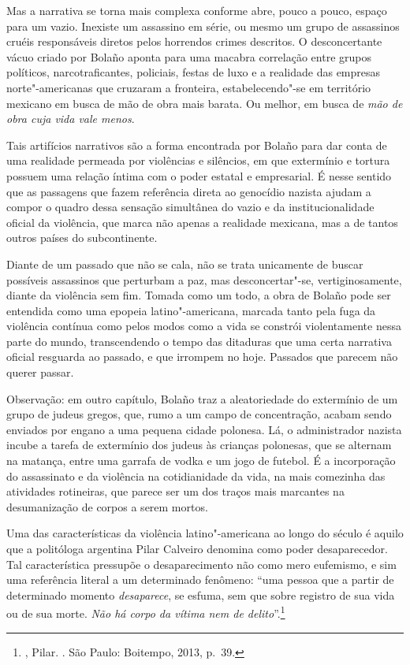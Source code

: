 Mas a narrativa se torna mais complexa conforme abre, pouco a pouco,
espaço para um vazio. Inexiste um assassino em série, ou mesmo um grupo
de assassinos cruéis responsáveis diretos pelos horrendos crimes
descritos. O desconcertante vácuo criado por Bolaño aponta para uma
macabra correlação entre grupos políticos, narcotraficantes, policiais,
festas de luxo e a realidade das empresas norte"-americanas que cruzaram
a fronteira, estabelecendo"-se em território mexicano em busca de mão de obra
mais barata. Ou melhor, em busca de \emph{mão de obra cuja vida vale
menos}.

Tais artifícios narrativos são a forma encontrada por Bolaño para dar
conta de uma realidade permeada por violências e silêncios, em que
extermínio e tortura possuem uma relação íntima com o poder estatal e
empresarial. É nesse sentido que as passagens que fazem referência
direta ao genocídio nazista ajudam a compor o quadro dessa sensação
simultânea do vazio e da institucionalidade oficial da violência, que
marca não apenas a realidade mexicana, mas a de tantos outros países do
subcontinente.

Diante de um passado que não se cala, não se trata unicamente de buscar possíveis
assassinos que perturbam a paz, mas desconcertar"-se, vertiginosamente,
diante da violência sem fim. Tomada como um todo, a obra de Bolaño pode
ser entendida como uma epopeia latino"-americana, marcada tanto pela
fuga da violência contínua como pelos modos como a vida se constrói
violentamente nessa parte do mundo, transcendendo o tempo das ditaduras
que uma certa narrativa oficial resguarda ao passado, e que irrompem no
hoje. Passados que parecem não querer passar.

Observação: em outro capítulo, Bolaño traz a aleatoriedade do extermínio
de um grupo de judeus gregos, que, rumo a um campo de concentração,
acabam sendo enviados por engano a uma pequena cidade polonesa. Lá, o
administrador nazista incube a tarefa de extermínio dos judeus às
crianças polonesas, que se alternam na matança, entre uma garrafa de vodka
e um jogo de futebol. É a incorporação do assassinato e da violência na
cotidianidade da vida, na mais comezinha das atividades rotineiras, que
parece ser um dos traços mais marcantes na desumanização de corpos a
serem mortos.

\asterisc

Uma das características da violência latino"-americana ao longo do século
 é aquilo que a politóloga argentina Pilar Calveiro denomina como
poder desaparecedor. Tal característica pressupõe o desaparecimento não
como mero eufemismo, e sim uma referência literal a um determinado
fenômeno: ``uma pessoa que a partir de determinado momento
\emph{desaparece}, se esfuma, sem que sobre registro de sua vida ou de
sua morte. \emph{Não há corpo da vítima nem de delito}''.\footnote{,
  Pilar. {}. São Paulo: Boitempo, 2013, p.~39.}

